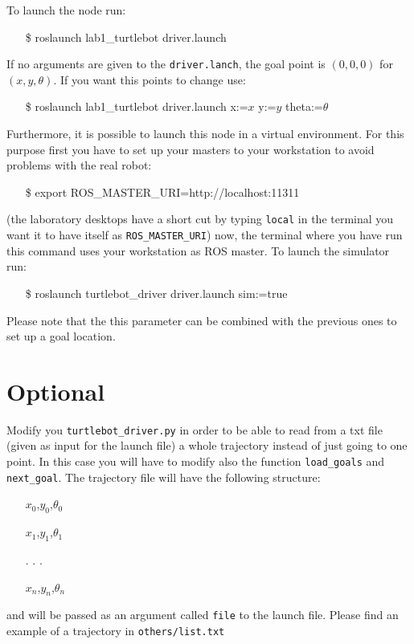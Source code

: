 \documentclass[a4paper,10pt]{article}
\begin{document}
To launch the node run:
\begin{shaded}
	\begin{itemize}
		\item[\$] roslaunch lab1\_turtlebot driver.launch
	\end{itemize}
\end{shaded}
If no arguments are given to the \texttt{driver.lanch}, the goal point is $(0,0,0)$ for $(x,y,\theta)$. If you want this points to change use:
\begin{shaded}
	\begin{itemize}
		\item[\$] roslaunch lab1\_turtlebot driver.launch x:=$x$ y:=$y$ theta:=$\theta$
	\end{itemize}
\end{shaded}
Furthermore, it is possible to launch this node in a virtual environment. For this purpose first you have to set up your masters to your workstation to avoid problems with the real robot:
\begin{shaded}
	\begin{itemize}
		\item[\$] export ROS\_MASTER\_URI=http://localhost:11311
	\end{itemize}
\end{shaded}
(the laboratory desktops have a short cut by typing \texttt{local} in the terminal you want it to have itself as \texttt{ROS\_MASTER\_URI}) now, the terminal where you have run this command uses your workstation as ROS master. To launch the simulator run:
\begin{shaded}
	\begin{itemize}
		\item[\$] roslaunch turtlebot\_driver driver.launch sim:=true
	\end{itemize}
\end{shaded}
Please note that the this parameter can be combined with the previous ones to set up a goal location.


\section{Optional}

Modify you \texttt{turtlebot\_driver.py} in order to be able to read from a txt file (given as input for the launch file) a whole trajectory instead of just going to one point. In this case you will have to modify also the function \texttt{load\_goals} and \texttt{next\_goal}. The trajectory file will have the following structure:
\begin{shaded}
	\begin{itemize}
		\item[] $x_0$,$y_0$,$\theta_0$
		\item[] $x_1$,$y_1$,$\theta_1$
		\item[] . . .
		\item[] $x_n$,$y_n$,$\theta_n$
	\end{itemize}
\end{shaded}
and will be passed as an argument called \texttt{file} to the launch file. Please find an example of a trajectory in \texttt{others/list.txt}
\end{document}
